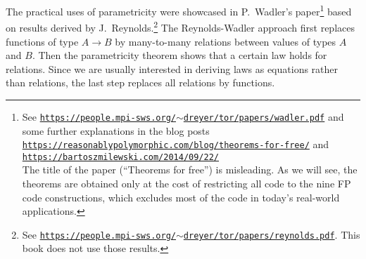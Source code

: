The practical uses of parametricity were showcased in P.~Wadler\textsf{'}s
paper\footnote{See \texttt{\href{https://people.mpi-sws.org/~dreyer/tor/papers/wadler.pdf}{https://people.mpi-sws.org/$\sim$dreyer/tor/papers/wadler.pdf}}
and some further explanations in the blog posts \texttt{\href{https://reasonablypolymorphic.com/blog/theorems-for-free/}{https://reasonablypolymorphic.com/blog/theorems-for-free/}}
and \texttt{\href{https://bartoszmilewski.com/2014/09/22/}{https://bartoszmilewski.com/2014/09/22/}}\\
The title of the paper (\textsf{``}Theorems for free\textsf{''})
is misleading. As we will see, the theorems are obtained only at the
cost of restricting all code to the nine FP code constructions, which
excludes most of the code in today\textsf{'}s real-world applications.} based on results derived by J.~Reynolds.\footnote{See \texttt{\href{https://people.mpi-sws.org/~dreyer/tor/papers/reynolds.pdf}{https://people.mpi-sws.org/$\sim$dreyer/tor/papers/reynolds.pdf}}.
This book does not use those results. } The Reynolds-Wadler approach first replaces functions of type $A\rightarrow B$
by many-to-many relations between values of types $A$ and $B$. Then
the parametricity theorem shows that a certain law holds for relations.
Since we are usually interested in deriving laws as equations rather
than relations, the last step replaces all relations by functions.

